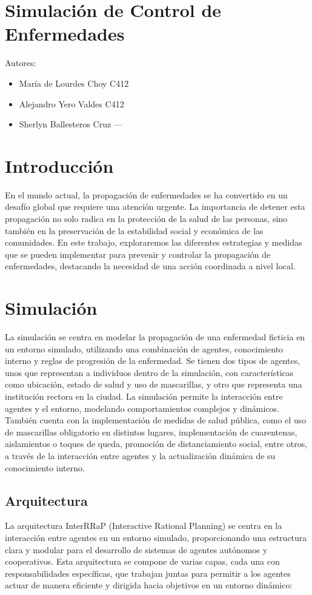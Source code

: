 \section{Simulación de Control de Enfermedades}
Autores:
\begin{itemize}
    \item María de Lourdes Choy C412
    \item Alejandro Yero Valdes C412
    \item Sherlyn Ballesteros Cruz ---
\end{itemize}

\section{Introducción}
En el mundo actual, la propagación de enfermedades se ha convertido en un desafío global que requiere una atención urgente. La importancia de detener esta propagación no solo radica en la protección de la salud de las personas, sino también en la preservación de la estabilidad social y económica de las comunidades. En este trabajo, exploraremos las diferentes estrategias y medidas que se pueden implementar para prevenir y controlar la propagación de enfermedades, destacando la necesidad de una acción coordinada a nivel local.

\section{Simulación}
La simulación se centra en modelar la propagación de una enfermedad ficticia en un entorno simulado, utilizando una combinación de agentes, conocimiento interno y reglas de progresión de la enfermedad. Se tienen dos tipos de agentes, unos que representan a individuos dentro de la simulación, con características como ubicación, estado de salud y uso de mascarillas, y otro que representa una institución rectora en la ciudad. La simulación permite la interacción entre agentes y el entorno, modelando comportamientos complejos y dinámicos. También cuenta con la implementación de medidas de salud pública, como el uso de mascarillas obligatorio en distintos lugares, implementación de cuarentenas, aislamientos o toques de queda, promoción de distanciamiento social, entre otros, a través de la interacción entre agentes y la actualización dinámica de su conocimiento interno.

\subsection{Arquitectura}
La arquitectura InterRRaP (Interactive Rational Planning) se centra en la interacción entre agentes en un entorno simulado, proporcionando una estructura clara y modular para el desarrollo de sistemas de agentes autónomos y cooperativos. Esta arquitectura se compone de varias capas, cada una con responsabilidades específicas, que trabajan juntas para permitir a los agentes actuar de manera eficiente y dirigida hacia objetivos en un entorno dinámico:

